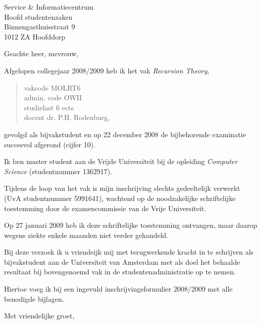 \documentclass[a4paper,11pt]{brief}
\date{8 juli 2009}
\begin{document}
\begin{letter}{Service \& Informatiecentrum\\
Hoofd studentenzaken\\
Binnengasthuisstraat 9\\
1012 ZA Hoofddorp}

\opening{Geachte heer, mevrouw,}

Afgelopen collegejaar 2008/2009 heb ik het vak \emph{Recursion Theory},
\begin{quote}
vakcode MOLRT6\\
admin. code OWII\\
studielast 6 ects\\
docent dr. P.H. Rodenburg,
\end{quote}
gevolgd als bijvakstudent en op 22 december 2008 de bijbehorende
examinatie succesvol afgerond (cijfer 10).

Ik ben master student aan de Vrijde Universiteit bij de opleiding
\emph{Computer Science} (studentnummer 1362917).

Tijdens de loop van het vak is mijn inschrijving slechts gedeeltelijk
verwerkt (UvA studentnummer 5991641), wachtend op de noodzakelijke
schriftelijke toestemming door de examencommissie van de Vrije
Universiteit.

Op 27 januari 2009 heb ik deze schriftelijke toestemming ontvangen,
maar daarop wegens ziekte enkele maanden niet verder gehandeld.

Bij deze verzoek ik u vriendeijk mij met terugwerkende kracht in te
schrijven als bijvakstudent aan de Universiteit van Amsterdam met als
doel het behaalde resultaat bij bovengenoemd vak in de studentenadministratie
op te nemen.

Hiertoe voeg ik bij een ingevuld inschrijvingsformulier 2008/2009 met
alle benodigde bijlagen.

\closing{Met vriendelijke groet,}

\end{letter}
\end{document}

